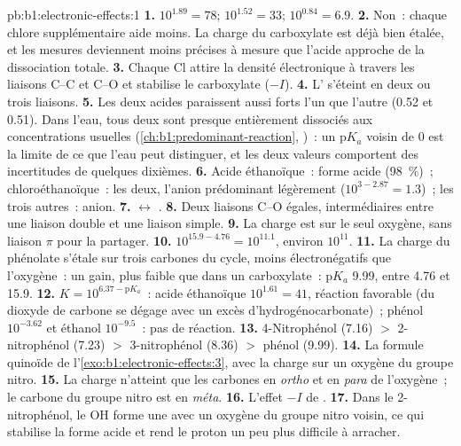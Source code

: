 \begin{solution}{pb:b1:electronic-effects:1}
\textbf{1.} $10^{1.89} = 78$; $10^{1.52} = 33$; $10^{0.84} = 6.9$.
\textbf{2.} Non~: chaque chlore supplémentaire aide moins. La charge du
carboxylate est déjà bien étalée, et les mesures deviennent moins
précises à mesure que l'acide approche de la dissociation totale.
\textbf{3.} Chaque Cl attire la densité électronique à travers les
liaisons C--C et C--O et stabilise le carboxylate ($-I$).
\textbf{4.} L' s'éteint en deux ou trois liaisons.
\textbf{5.} Les deux acides paraissent aussi forts l'un que l'autre
(0.52 et 0.51). Dans l'eau, tous deux sont presque entièrement dissociés
aux concentrations usuelles (\cref{ch:b1:predominant-reaction}, )~: un $\mathrm{p}K_a$ voisin de 0 est la limite de ce que l'eau
peut distinguer, et les deux valeurs comportent des incertitudes de
quelques dixièmes.
\textbf{6.} Acide éthanoïque~: forme acide (\qty{98}{\percent})~;
chloroéthanoïque~: les deux, l'anion prédominant légèrement
($10^{3 - 2.87} = 1.3$)~; les trois autres~: anion.
\textbf{7.}  $\leftrightarrow$ .
\textbf{8.} Deux liaisons C--O égales, intermédiaires entre une liaison
double et une liaison simple.
\textbf{9.} La charge est sur le seul oxygène, sans liaison $\pi$ pour la
partager.
\textbf{10.} $10^{15.9 - 4.76} = 10^{11.1}$, environ $10^{11}$.
\textbf{11.} La charge du phénolate s'étale sur trois carbones du cycle,
moins électronégatifs que l'oxygène~: un gain, plus faible que dans un
carboxylate~: $\mathrm{p}K_a$ 9.99, entre 4.76 et 15.9.
\textbf{12.} $K = 10^{6.37 - \mathrm{p}K_a}$~: acide éthanoïque
$10^{1.61} = 41$, réaction favorable (du dioxyde de carbone se dégage
avec un excès d'hydrogénocarbonate)~; phénol $10^{-3.62}$ et éthanol
$10^{-9.5}$~: pas de réaction.
\textbf{13.} 4-Nitrophénol (7.16) $>$ 2-nitrophénol (7.23) $>$
3-nitrophénol (8.36) $>$ phénol (9.99).
\textbf{14.} La formule quinoïde de l'\cref{exo:b1:electronic-effects:3},
avec la charge sur un oxygène du groupe nitro.
\textbf{15.} La charge n'atteint que les carbones en \textit{ortho} et en
\textit{para} de l'oxygène~; le carbone du groupe nitro est en
\textit{méta}.
\textbf{16.} L'effet $-I$ de .
\textbf{17.} Dans le 2-nitrophénol, le OH forme une 
avec un oxygène du groupe nitro voisin, ce qui stabilise la forme acide
et rend le proton un peu plus difficile à arracher.

\end{solution}

